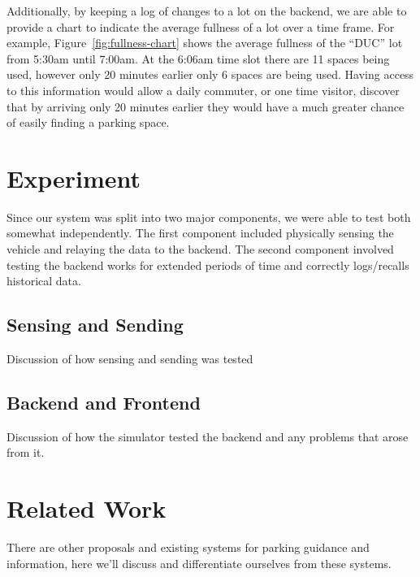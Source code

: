 \documentclass{acm_proc}
\begin{document}
Additionally, by keeping a log of changes to a lot on the backend, we are
able to provide a chart to indicate the average fullness of a lot over a
time frame.
For example, Figure~\ref{fig:fullness-chart} shows the average fullness of
the ``DUC'' lot from 5:30am until 7:00am.
At the 6:06am time slot there are 11 spaces being used, however only 20
minutes earlier only 6 spaces are being used.
Having access to this information would allow a daily commuter, or one time
visitor, discover that by arriving only 20 minutes earlier they would have
a much greater chance of easily finding a parking space.

\section{Experiment}\label{sec:experiment}

Since our system was split into two major components, we were able to test
both somewhat independently. 
The first component included physically sensing the vehicle and relaying
the data to the backend.
The second component involved testing the backend works for extended
periods of time and correctly logs/recalls historical data.

\subsection{Sensing and Sending}

Discussion of how sensing and sending was tested

\subsection{Backend and Frontend}

Discussion of how the simulator tested the backend and any problems that
arose from it.

\section{Related Work}\label{sec:related}

There are other proposals and existing systems for parking guidance and
information, here we'll discuss and differentiate ourselves from these
systems.
\end{document}
